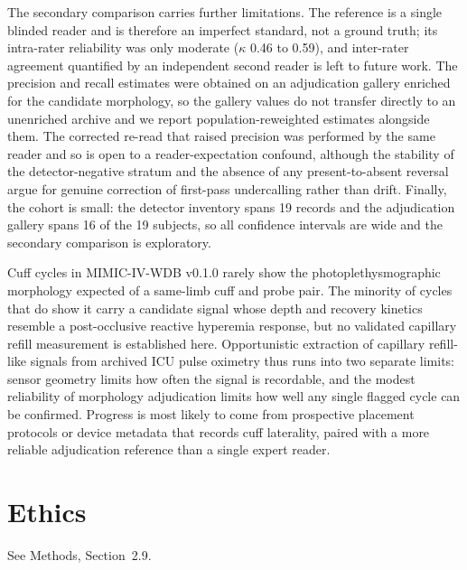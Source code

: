 \documentclass[twocolumn,letterpaper,10pt]{article}
\begin{document}
The secondary comparison carries further limitations. The reference is a single blinded reader and is therefore an imperfect standard, not a ground truth;\cite{reitsma2009_imperfect_reference,rutjes2007_no_gold_standard,bossuyt2015_stard} its intra-rater reliability was only moderate ($\kappa$ 0.46 to 0.59), and inter-rater agreement quantified by an independent second reader is left to future work. The precision and recall estimates were obtained on an adjudication gallery enriched for the candidate morphology, so the gallery values do not transfer directly to an unenriched archive and we report population-reweighted estimates alongside them.\cite{begg1983_verification_bias,ransohoff1978_spectrum_bias} The corrected re-read that raised precision was performed by the same reader and so is open to a reader-expectation confound, although the stability of the detector-negative stratum and the absence of any present-to-absent reversal argue for genuine correction of first-pass undercalling rather than drift. Finally, the cohort is small: the detector inventory spans 19 records and the adjudication gallery spans 16 of the 19 subjects, so all confidence intervals are wide and the secondary comparison is exploratory.

Cuff cycles in MIMIC-IV-WDB v0.1.0 rarely show the photoplethysmographic morphology expected of a same-limb cuff and probe pair. The minority of cycles that do show it carry a candidate signal whose depth and recovery kinetics resemble a post-occlusive reactive hyperemia response, but no validated capillary refill measurement is established here. Opportunistic extraction of capillary refill-like signals from archived ICU pulse oximetry thus runs into two separate limits: sensor geometry limits how often the signal is recordable, and the modest reliability of morphology adjudication limits how well any single flagged cycle can be confirmed. Progress is most likely to come from prospective placement protocols or device metadata that records cuff laterality, paired with a more reliable adjudication reference than a single expert reader.

\section*{Ethics}

See Methods, Section~2.9.
\end{document}
